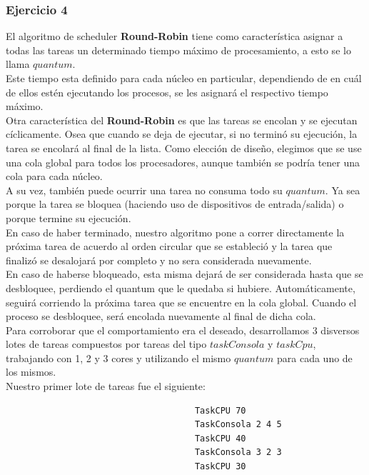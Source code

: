 \subsubsection[Resolución Ejercicio 4]{Ejercicio 4}

\indent El algoritmo de scheduler \textbf{Round-Robin} tiene como caracter\'istica asignar a todas las tareas 
un determinado tiempo m\'aximo de procesamiento, a esto se lo llama $quantum$. \\
\indent Este tiempo esta definido para cada n\'ucleo en particular, dependiendo de en cu\'al de ellos est\'en 
ejecutando los procesos, se les asignar\'a el respectivo tiempo m\'aximo.\\
\indent Otra caracter\'istica del \textbf{Round-Robin} es que las tareas se encolan y se ejecutan c\'iclicamente. 
Osea que cuando se deja de ejecutar, si no termin\'o su ejecuci\'on, la tarea se encolar\'a al final de la lista. 
Como elecci\'on de diseño, elegimos que se use una cola global para todos los procesadores, aunque tambi\'en
se podr\'ia tener una cola para cada n\'ucleo. \\
\indent A su vez, tambi\'en puede ocurrir una tarea no consuma todo su $quantum$. 
Ya sea porque la tarea se bloquea (haciendo uso de dispositivos de entrada/salida) o porque termine su ejecuci\'on.\\
\indent En caso de haber terminado, nuestro algoritmo pone a correr directamente la pr\'oxima tarea de acuerdo al orden 
circular que se estableci\'o y la tarea que finaliz\'o se desalojar\'a por completo y no sera considerada nuevamente. \\
\indent En caso de haberse bloqueado, esta misma dejar\'a de ser considerada hasta que se desbloquee, 
perdiendo el quantum que le quedaba si hubiere. 
Autom\'aticamente, seguir\'a corriendo la pr\'oxima tarea que se encuentre en la cola global. 
Cuando el proceso se desbloquee, ser\'a encolada nuevamente al final de dicha cola.   \\

\indent Para corroborar que el comportamiento era el deseado, desarrollamos 3 disversos lotes de tareas compuestos por tareas
del tipo $taskConsola$ y $taskCpu$, trabajando con 1, 2 y 3 cores y utilizando el mismo $quantum$ para cada uno de los mismos.\\

Nuestro primer lote de tareas fue el siguiente:
\begin{verbatim}
                                     TaskCPU 70
                                     TaskConsola 2 4 5
                                     TaskCPU 40
                                     TaskConsola 3 2 3
                                     TaskCPU 30
\end{verbatim}

